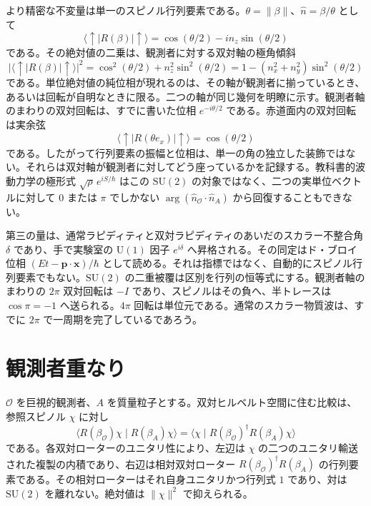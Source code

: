\documentclass[a4paper]{article}
\begin{document}
より精密な不変量は単一のスピノル行列要素である。\(\theta=\lVert\beta\rVert\)、\(\hat n=\beta/\theta\) として
\[
\langle\uparrow\rvert R(\beta)\lvert\uparrow\rangle
  =\cos(\theta/2)-i n_z\sin(\theta/2)
\]
である。その絶対値の二乗は、観測者に対する双対軸の極角傾斜
\[
\bigl\lvert\langle\uparrow\rvert R(\beta)\lvert\uparrow\rangle\bigr\rvert^2
  =\cos^2(\theta/2)+n_z^2\sin^2(\theta/2)
  =1-(n_x^2+n_y^2)\sin^2(\theta/2)
\]
である。単位絶対値の純位相が現れるのは、その軸が観測者に揃っているとき、あるいは回転が自明なときに限る。二つの軸が同じ幾何を明瞭に示す。観測者軸のまわりの双対回転は、すでに書いた位相 \(e^{-i\theta/2}\) である。赤道面内の双対回転は実余弦
\[
\langle\uparrow\rvert R(\theta e_x)\lvert\uparrow\rangle=\cos(\theta/2)
\]
である。したがって行列要素の振幅と位相は、単一の角の独立した装飾ではない。それらは双対軸が観測者に対してどう座っているかを記録する。教科書的波動力学の極形式 \(\sqrt{\rho}\,e^{iS/\hbar}\) はこの \(\mathrm{SU}(2)\) の対象ではなく、二つの実単位ベクトルに対して \(0\) または \(\pi\) でしかない \(\arg(\hat n_{\mathcal{O}}\cdot\hat n_A)\) から回復することもできない。

第三の量は、通常ラピディティと双対ラピディティのあいだのスカラー不整合角 \(\delta\) であり、手で実験室の \(\mathrm{U}(1)\) 因子 \(e^{i\delta}\) へ昇格される。その同定はド・ブロイ位相 \((Et-\mathbf{p}\cdot\mathbf{x})/\hbar\) として読める。それは指標ではなく、自動的にスピノル行列要素でもない。\(\mathrm{SU}(2)\) の二重被覆は区別を行列の恒等式にする。観測者軸のまわりの \(2\pi\) 双対回転は \(-I\) であり、スピノルはその負へ、半トレースは \(\cos\pi=-1\) へ送られる。\(4\pi\) 回転は単位元である。通常のスカラー物質波は、すでに \(2\pi\) で一周期を完了しているであろう。

\section{観測者重なり}

\(\mathcal{O}\) を巨視的観測者、\(A\) を質量粒子とする。双対ヒルベルト空間に住む比較は、参照スピノル \(\chi\) に対し
\[
\langle R(\beta_{\mathcal{O}})\chi\mid R(\beta_A)\chi\rangle
  =\langle\chi\mid R(\beta_{\mathcal{O}})^{\dagger}R(\beta_A)\chi\rangle
\]
である。各双対ローターのユニタリ性により、左辺は \(\chi\) の二つのユニタリ輸送された複製の内積であり、右辺は相対双対ローター \(R(\beta_{\mathcal{O}})^{\dagger}R(\beta_A)\) の行列要素である。その相対ローターはそれ自身ユニタリかつ行列式 \(1\) であり、対は \(\mathrm{SU}(2)\) を離れない。絶対値は \(\lVert\chi\rVert^2\) で抑えられる。
\end{document}
